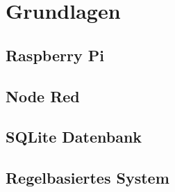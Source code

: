 \chapter{Grundlagen}

\section{Raspberry Pi}

\section{Node Red}

\section{SQLite Datenbank}

\section{Regelbasiertes System}

